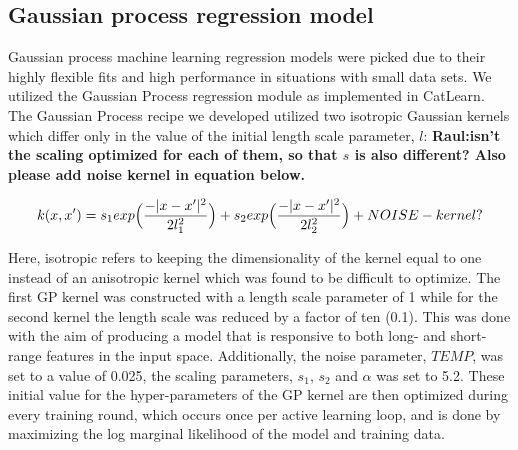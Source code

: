 \subsection{Gaussian process regression model}  %
%


%
%
Gaussian process machine learning regression models were picked due to their highly flexible fits and high performance in situations with small data sets.
%
We utilized the Gaussian Process regression module as implemented in CatLearn.\cite{hansen2019atomistic,CatLearn_Repo}
%
The Gaussian Process recipe we developed utilized two isotropic Gaussian kernels which differ only in the value of the initial length scale parameter, $l$: \textbf{Raul:isn't the scaling optimized for each of them, so that $s$ is also different? Also please add noise kernel in equation below.}

\begin{equation}
    k(x,x') = s_1 exp \Bigl ( \frac{-|x-x'|^2}{2l_1^2}\Bigr) + s_2 exp\Bigl(\frac{-|x-x'|^2}{2l_2^2}\Bigr) + NOISE-kernel?
\end{equation}


Here, isotropic refers to keeping the dimensionality of the kernel equal to one instead of an anisotropic kernel which was found to be difficult to optimize.
%
The first GP kernel was constructed with a length scale parameter of 1 while for the second kernel the length scale was reduced by a factor of ten (0.1). This was done with the aim of producing a model that is responsive to both long- and short-range features in the input space.
%
Additionally, the noise parameter, $TEMP$, was set to a value of \num{0.025}, the scaling parameters, $s_1$, $s_2$ and $\alpha$ was set to 5.2.
%
These initial value for the hyper-parameters of the GP kernel are then optimized during every training round,
which occurs once per active learning loop,
and is done by maximizing the log marginal likelihood of the model and training data.





